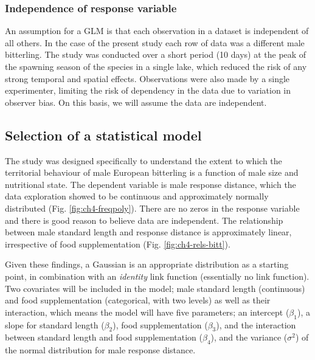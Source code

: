 \documentclass[
]{book}
\begin{document}
\hypertarget{independence-of-response-variable}{%
\subsubsection{Independence of response variable}\label{independence-of-response-variable}}

An assumption for a GLM is that each observation in a dataset is independent of all others. In the case of the present study each row of data was a different male bitterling. The study was conducted over a short period (10 days) at the peak of the spawning season of the species in a single lake, which reduced the risk of any strong temporal and spatial effects. Observations were also made by a single experimenter, limiting the risk of dependency in the data due to variation in observer bias. On this basis, we will assume the data are independent.

\hypertarget{selection-of-a-statistical-model}{%
\subsection{Selection of a statistical model}\label{selection-of-a-statistical-model}}

The study was designed specifically to understand the extent to which the territorial behaviour of male European bitterling is a function of male size and nutritional state. The dependent variable is male response distance, which the data exploration showed to be continuous and approximately normally distributed (Fig. \ref{fig:ch4-freqpoly}). There are no zeros in the response variable and there is good reason to believe data are independent. The relationship between male standard length and response distance is approximately linear, irrespective of food supplementation (Fig. \ref{fig:ch4-rels-bitt}).

Given these findings, a Gaussian is an appropriate distribution as a starting point, in combination with an \emph{identity} link function (essentially no link function). Two covariates will be included in the model; male standard length (continuous) and food supplementation (categorical, with two levels) as well as their interaction, which means the model will have five parameters; an intercept (\(\beta_1\)), a slope for standard length (\(\beta_2\)), food supplementation (\(\beta_3\)), and the interaction between standard length and food supplementation (\(\beta_4\)), and the variance (\(\sigma^2\)) of the normal distribution for male response distance.
\end{document}
